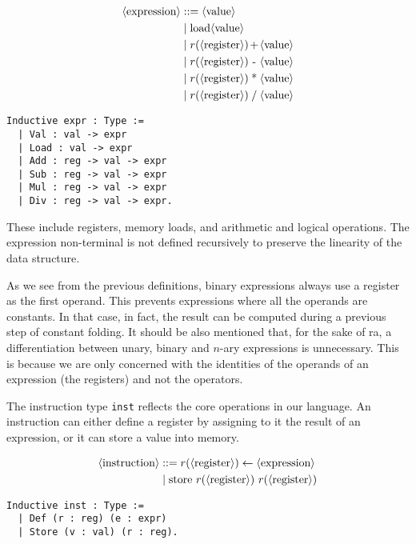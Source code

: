\begin{minipage}{0.45\textwidth}
\begin{align*}
\nt{expression} &::= \nt{value} \\
&\mid \text{load} \nt{value} \\
&\mid r( \nt{register} ) \makebox[1em]{+} \nt{value} \\
&\mid r( \nt{register} ) \makebox[1em]{-} \nt{value} \\
&\mid r( \nt{register} ) \makebox[1em]{*} \nt{value} \\
&\mid r( \nt{register} ) \makebox[1em]{/} \nt{value} \\
\end{align*}
\end{minipage}
\hfill
\begin{minipage}{0.45\textwidth}
\begin{lstlisting}[style=Rocq]
Inductive expr : Type :=
  | Val : val -> expr
  | Load : val -> expr
  | Add : reg -> val -> expr
  | Sub : reg -> val -> expr
  | Mul : reg -> val -> expr
  | Div : reg -> val -> expr.
\end{lstlisting}
\end{minipage}

These include registers, memory loads, and arithmetic and logical operations. The expression non-terminal is not defined recursively to preserve the linearity of the data structure.

As we see from the previous definitions, binary expressions always use a register as the first operand. This prevents expressions where all the operands are constants. In that case, in fact, the result can be computed during a previous step of constant folding. It should be also mentioned that, for the sake of \gls{ra}, a differentiation between unary, binary and $n$-ary expressions is unnecessary. This is because we are only concerned with the identities of the operands of an expression (the registers) and not the operators.

The instruction type \texttt{inst} reflects the core operations in our language. An instruction can either define a register by assigning to it the result of an expression, or it can store a value into memory.

\begin{minipage}{0.55\linewidth}
\begin{align*}
\langle\text{instruction}\rangle &::= r( \langle\text{register}\rangle ) \leftarrow \langle\text{expression}\rangle \\
&\mid \text{store} \ r( \langle\text{register}\rangle ) \ r( \langle\text{register}\rangle ) \\
\end{align*}
\end{minipage}
\hfill
\begin{minipage}{0.40\linewidth}
\begin{lstlisting}[style=Rocq]
Inductive inst : Type :=
  | Def (r : reg) (e : expr)
  | Store (v : val) (r : reg).
\end{lstlisting}
\end{minipage}


